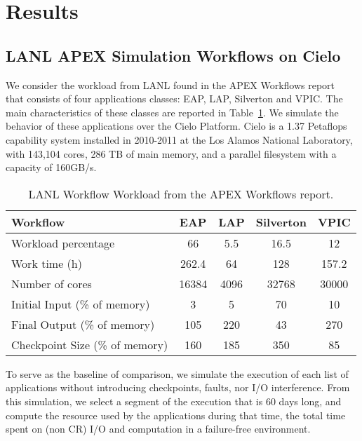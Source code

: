 
\section{Results}\label{sec:results}

\subsection{LANL APEX Simulation Workflows on Cielo}

We consider the workload from LANL found in the APEX Workflows
report~\cite{apex2016} that consists of four applications
classes: EAP, LAP, Silverton and VPIC. The main characteristics of
these classes are reported in Table~\ref{table:lanl}. We simulate the
behavior of these applications over the Cielo Platform. Cielo is a
1.37 Petaflops capability system installed in 2010-2011 at the Los
Alamos National Laboratory, with 143,104 cores, 286 TB of main memory,
and a parallel filesystem with a capacity of 160GB/s.

\begin{table}
\begin{tabular}{|l|c|c|c|c|}
\hline
 Workflow & EAP & LAP & Silverton & VPIC \\\hline
Workload percentage & 66 & 5.5 & 16.5 & 12 \\\hline
Work time (h) & 262.4 & 64 & 128 & 157.2 \\\hline
Number of cores & 16384 & 4096 & 32768 & 30000 \\\hline
Initial Input (\% of memory) &  3 & 5 & 70 & 10 \\\hline
Final Output (\% of memory) & 105 & 220 & 43 & 270 \\\hline
Checkpoint Size (\% of memory) & 160 & 185 & 350 & 85 \\\hline
\end{tabular}
\caption{LANL Workflow Workload from the APEX Workflows report.\label{table:lanl}}
\end{table}

To serve as the baseline of comparison, we simulate the execution of
each list of applications without introducing checkpoints, faults, nor
I/O interference. From this simulation, we select a segment of the
execution that is 60 days long, and compute the resource
used by the applications during that time, \ie the total time
spent on (non CR) I/O and computation in a failure-free environment.

